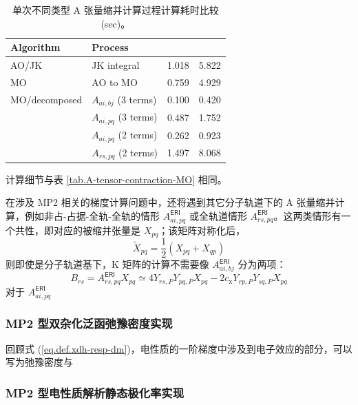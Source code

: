 \begin{table}[h]
  \centering
  \caption{单次不同类型 A 张量缩并计算过程计算耗时比较 (sec)。}
  \label{tab.A-tensor-contraction-more-MO}
  \begin{tabular}{ll:d{2.4}d{2.4}}
  \hline
  Algorithm     & Process          &  &  \\ \hline
  AO/JK         & JK integral      & 1.018 & 5.822  \\
  MO            & AO to MO         & 0.759 & 4.929  \\
  MO/decomposed & $A_{ai, bj}$ (3 terms) & 0.100 & 0.420  \\
                & $A_{ai, pq}$ (3 terms) & 0.487 & 1.752  \\
                & $A_{ai, pq}$ (2 terms) & 0.262 & 0.923  \\
                & $A_{rs, pq}$ (2 terms) & 1.497 & 8.068  \\ \hline
  \end{tabular}

  \raggedright
   计算细节与表 \ref{tab.A-tensor-contraction-MO} 相同。
\end{table}

在涉及 MP2 相关的梯度计算问题中，还将遇到\alert{其它分子轨道}下的 A 张量缩并计算，例如非占-占据-全轨-全轨的情形 $A_{ai, pq}^\textsf{ERI}$ 或全轨道情形 $A_{rs, pq}^\textsf{ERI}$。这两类情形有一个共性，即对应的被缩并张量是 $X_{pq}$；该矩阵对称化后，
\begin{equation*}
  \tilde X_{pq} = \frac{1}{2} \left( X_{pq} + X_{qp} \right)
\end{equation*}
则即使是分子轨道基下，K 矩阵的计算不需要像 $A_{ai, bj}^\textsf{ERI}$ 分为两项：
\begin{equation}
  B_{rs} = A_{rs, pq}^\textsf{ERI} X_{pq} \simeq 4 Y_{rs, P} Y_{pq, P} X_{pq} - 2 c_\mathrm{x} Y_{rp, P} Y_{sq, P} X_{pq}
\end{equation}
对于 $A_{ai, pq}^\textsf{ERI}$ 


\subsubsection{MP2 型双杂化泛函弛豫密度实现}

回顾式 (\ref{eq.def.xdh-resp-dm})，电性质的一阶梯度中涉及到电子效应的部分，可以写为弛豫密度与

\subsubsection{MP2 型电性质解析静态极化率实现}

